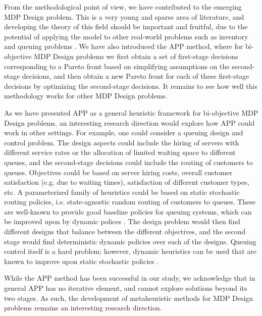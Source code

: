 \documentclass[11pt,authoryear,a4paper]{article}
\theoremstyle{definition}
\begin{document}
From the methodological point of view, we have contributed to the emerging MDP Design problem. This is a very young and sparse area of literature, and developing the theory of this field should be important and fruitful, due to the potential of applying the model to other real-world problems such as inventory and queuing problems \citep{BROWN2024mdpDesignLetters}. %
We have also introduced the APP method, where for bi-objective MDP Design problems we first obtain a set of first-stage decisions corresponding to a Pareto front based on simplifying assumptions on the second-stage decisions, and then obtain a new Pareto front for each of these first-stage decisions by optimizing the second-stage decisions. It remains to see how well this methodology works for other MDP Design problems.  

{As we have presented APP as a general heuristic framework for bi-objective MDP Design problems, an interesting research direction would explore how APP could work in other settings. For example, one could consider a queuing design and control problem. The design aspects could include the hiring of servers with different service rates or the allocation of limited waiting space to different queues, and the second-stage decisions could include the routing of customers to queues. Objectives could be based on server hiring costs, overall customer satisfaction (e.g. due to waiting times), satisfaction of different customer types, etc. A parameterized family of heuristics could be based on static stochastic routing policies, i.e. state-agnostic random routing of customers to queues. These are well-known to provide good baseline policies for queuing systems, which can be improved upon by dynamic polices \citep{shone2020queueing}. The design problem would then find different designs that balance between the different objectives, and the second stage would find deterministic dynamic policies over each of the designs. Queuing control itself is a hard problem; however, dynamic heuristics can be used that are known to improve upon static stochastic policies \citep{krishnan1990,argon2009,shone2020queueing}.} 

{While the APP method has been successful in our study, we acknowledge that in general APP has no iterative element, and cannot explore solutions beyond its two stages. As such, the development of metaheuristic methods for MDP Design problems remains an interesting research direction.}
\end{document}
